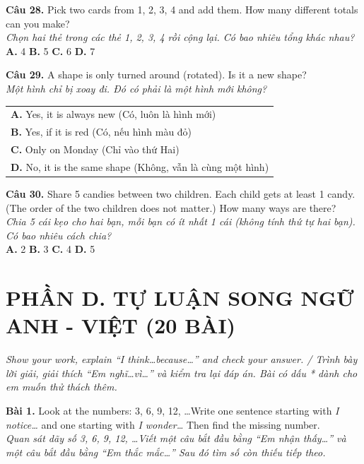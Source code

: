 \documentclass[11pt,a4paper]{article}
\newcommand{\answerline}{\noindent\dotfill\par\vspace{0.8mm}}
\begin{document}
\textbf{Câu 28.} Pick two cards from 1, 2, 3, 4 and add them. How many different totals can you make?\\
\textit{Chọn hai thẻ trong các thẻ 1, 2, 3, 4 rồi cộng lại. Có bao nhiêu tổng khác nhau?}\\
\textbf{A.} 4 \quad \textbf{B.} 5 \quad \textbf{C.} 6 \quad \textbf{D.} 7\par\vspace{1.2mm}

\textbf{Câu 29.} A shape is only turned around (rotated). Is it a new shape?\\
\textit{Một hình chỉ bị xoay đi. Đó có phải là một hình mới không?}\\
\begin{tabular}{@{}l@{}}
\textbf{A.} Yes, it is always new (Có, luôn là hình mới)\\
\textbf{B.} Yes, if it is red (Có, nếu hình màu đỏ)\\
\textbf{C.} Only on Monday (Chỉ vào thứ Hai)\\
\textbf{D.} No, it is the same shape (Không, vẫn là cùng một hình)
\end{tabular}\par\vspace{1.2mm}

\textbf{Câu 30.} Share 5 candies between two children. Each child gets at least 1 candy. (The order of the two children does not matter.) How many ways are there?\\
\textit{Chia 5 cái kẹo cho hai bạn, mỗi bạn có ít nhất 1 cái (không tính thứ tự hai bạn). Có bao nhiêu cách chia?}\\
\textbf{A.} 2 \quad \textbf{B.} 3 \quad \textbf{C.} 4 \quad \textbf{D.} 5\par\vspace{1.2mm}


\newpage
\section*{PHẦN D. TỰ LUẬN SONG NGỮ ANH - VIỆT (20 BÀI)}
\textit{Show your work, explain ``I think\ldots because\ldots'' and check your answer. / Trình bày lời giải, giải thích ``Em nghĩ\ldots vì\ldots'' và kiểm tra lại đáp án. Bài có dấu * dành cho em muốn thử thách thêm.}

\textbf{Bài 1.} Look at the numbers: 3, 6, 9, 12, \ldots Write one sentence starting with \textit{I notice\ldots} and one starting with \textit{I wonder\ldots} Then find the missing number.\\
\textit{Quan sát dãy số 3, 6, 9, 12, \ldots Viết một câu bắt đầu bằng ``Em nhận thấy\ldots'' và một câu bắt đầu bằng ``Em thắc mắc\ldots'' Sau đó tìm số còn thiếu tiếp theo.}\\
\answerline
\answerline
\answerline
\end{document}
